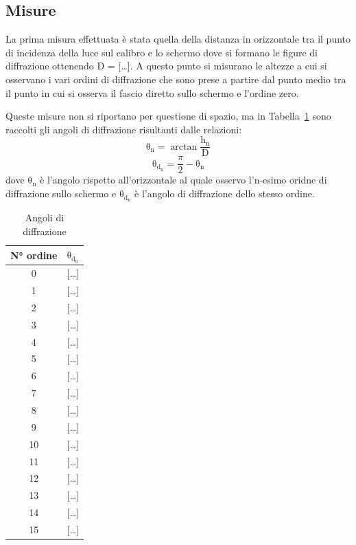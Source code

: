 \documentclass[10pt,a4paper]{article}
\newcommand{\rem}[1]{[\emph{#1}]}
\begin{document}
\subsection*{Misure}
La prima misura effettuata è stata quella della distanza in orizzontale tra il punto di incidenza della luce sul calibro e lo schermo dove si formano le figure di diffrazione ottenendo D = \rem{\dots}. A questo punto si misurano le altezze a cui si osservano i vari ordini di diffrazione che sono prese a partire dal punto medio tra il punto in cui si osserva il fascio diretto sullo schermo e l'ordine zero. \newpage

\noindent Queste misure non si riportano per questione di spazio, ma in Tabella~\ref{tab:diff} sono raccolti gli angoli di diffrazione risultanti dalle relazioni:
\begin{equation*}
\mathrm{\theta_n} = \mathrm{\arctan{\frac{h_n}{D}}}
\end{equation*}
\begin{equation*}
\mathrm{\theta_{d_n}} = \frac{\pi}{2} - \mathrm{\theta_n}
\end{equation*}
dove $\mathrm{\theta_n}$ è l'angolo rispetto all'orizzontale al quale osservo l'n-esimo oridne di diffrazione sullo schermo e $\mathrm{\theta_{d_n}}$ è l'angolo di diffrazione dello stesso ordine.
\begin{table}[h]
	\centering
	\caption{Angoli di diffrazione}
	\vspace{1mm}
	\begin{tabular}{cc}
	\hline
	N° ordine & $\mathrm{\theta_{d_n}}$ \\ \hline \hline
	0 & \rem{\dots} \\
	1 & \rem{\dots} \\
	2 & \rem{\dots} \\
	3 & \rem{\dots} \\
	4 & \rem{\dots} \\
	5 & \rem{\dots} \\
	6 & \rem{\dots} \\
	7 & \rem{\dots} \\
	8 & \rem{\dots} \\
	9 & \rem{\dots} \\
	10 & \rem{\dots} \\
	11 & \rem{\dots} \\
	12 & \rem{\dots} \\
	13 & \rem{\dots} \\
	14 & \rem{\dots} \\ 
	15 & \rem{\dots} \\ \hline
	\end{tabular}
	\label{tab:diff}
\end{table}
\end{document}
